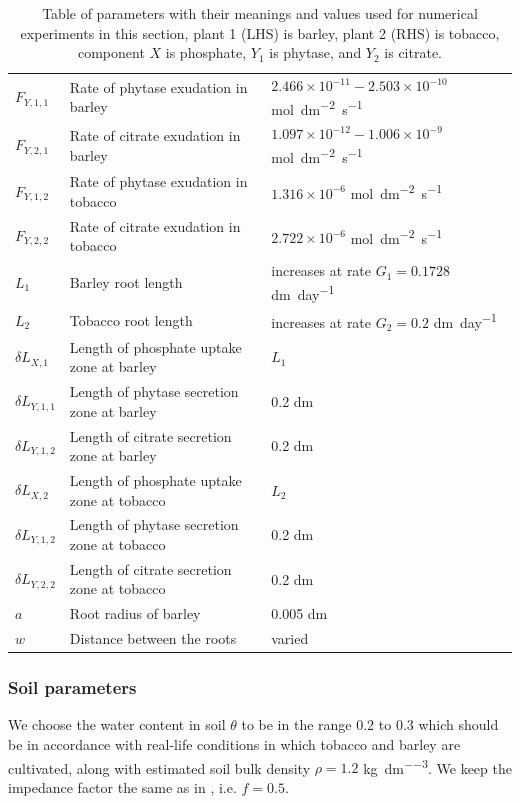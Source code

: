 \documentclass[11pt]{article}
\numberwithin{equation}{section}
\begin{document}
\begin{table}[!htb]
\begin{center}
\begin{tabular}{lll}
	$F_{Y,1,1} $ & Rate of phytase exudation in barley & $2.466 \times 10^{-11} - 2.503 \times 10^{-10}$  \si{mol.dm^{-2}. s^{-1}} \\
	$F_{Y,2,1} $ & Rate of citrate exudation in barley & $1.097 \times 10^{-12} - 1.006 \times 10^{-9}$ \si{mol.dm^{-2}. s^{-1}} \\
	$F_{Y,1,2} $ & Rate of phytase exudation in tobacco &  $1.316 \times 10^{-6}$ \si{mol.dm^{-2} .s^{-1}} \\
	$F_{Y,2,2} $ & Rate of citrate exudation in tobacco &  $2.722 \times 10^{-6}$ \si{mol.dm^{-2}.s^{-1}} \\
	$L_1$ & Barley root length & increases at rate $G_1 = 0.1728$ \si{dm.day^{-1}} \\
	$L_2$ & Tobacco root length & increases at rate $G_2 = 0.2$ \si{dm.day^{-1}} \\
	$\delta L_{X,1}$ & Length of phosphate uptake zone at barley & $L_1$\\
	$\delta L_{Y,1,1}$ & Length of phytase secretion zone at barley & 0.2 \si{dm} \\
	$\delta L_{Y,1,2}$ & Length of citrate secretion zone at barley & 0.2 \si{dm}\\
	$\delta L_{X,2}$ & Length of phosphate uptake zone at tobacco & $L_2$ \\
	$\delta L_{Y,1,2}$ &  Length of phytase secretion zone at tobacco & 0.2 \si{dm} \\
	$\delta L_{Y,2,2}$ &  Length of citrate secretion zone at tobacco & 0.2 \si{dm} \\
	$a$ & Root radius of barley & 0.005 \si{dm} \\
	$w$ & Distance between the roots & varied \\
\bottomrule

\end{tabular}
\caption{Table of parameters with their meanings and values used for numerical experiments in this section, plant 1 (LHS) is barley, plant 2 (RHS) is tobacco, component $X$ is phosphate, $Y_1$ is phytase, and $Y_2$ is citrate. \label{t:Second-model-params-values}
}
\end{center}

\end{table}

\subsubsection{Soil parameters}
We choose the water content in soil $\theta$ to be in the range $0.2$ to $0.3$ which should be in accordance with real-life conditions in which tobacco and barley are cultivated, along with estimated soil bulk density $\rho=1.2$ \si{kg\per dm^{-3}}. We keep the impedance factor the same as in \cite{Ptashnyk-2011}, i.e. $f=0.5$.
\end{document}
